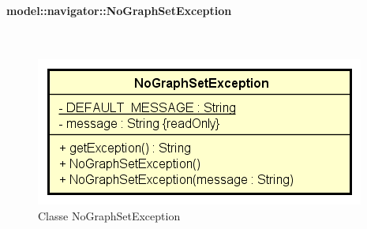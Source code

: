 \documentclass[../DefinizioneDiProdotto.tex]{subfiles}
\begin{document}
\paragraph{model::navigator::NoGraphSetException}
\
\begin{figure}[H]
	\centering
	\includegraphics[width=\maxwidth]{img/NoGraphSetException.png}
	\caption{Classe NoGraphSetException}\label{fig:model::navigator::NoGraphSetException} 
\end{figure}
\end{document}
